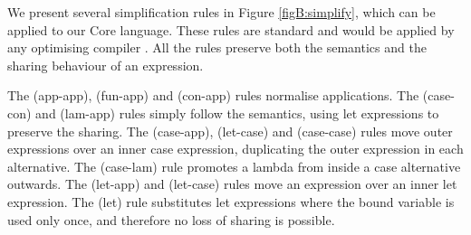 
We present several simplification rules in Figure \ref{figB:simplify}, which can be applied to our Core language. These rules are standard and would be applied by any optimising compiler \cite{spj:transformation}. All the rules preserve both the semantics and the sharing behaviour of an expression.

The (app-app), (fun-app) and (con-app) rules normalise applications. The (case-con) and (lam-app) rules simply follow the semantics, using let expressions to preserve the sharing. The (case-app), (let-case) and (case-case) rules move outer expressions over an inner case expression, duplicating the outer expression in each alternative. The (case-lam) rule promotes a lambda from inside a case alternative outwards. The (let-app) and (let-case) rules move an expression over an inner let expression. The (let) rule substitutes let expressions where the bound variable is used only once, and therefore no loss of sharing is possible.



